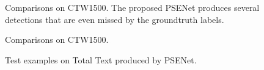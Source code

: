 \documentclass[10pt,twocolumn,letterpaper]{article}
\begin{document}
	
	\begin{figure}[b]
		\centering
		\setlength{\fboxrule}{0pt}
		\caption{Comparisons on CTW1500. The proposed PSENet produces several detections that are even missed by the groundtruth labels.}
		\label{fig:cmp_ctw1}
	\end{figure}
	
	\begin{figure}[b]
		\centering
		\setlength{\fboxrule}{0pt}
		\caption{Comparisons on CTW1500.}
		\label{fig:cmp_ctw2}
	\end{figure}
	
	\begin{figure}[b]
		\centering
		\setlength{\fboxrule}{0pt}
		\caption{Test examples on Total Text produced by PSENet.}
		\label{fig:tt}
	\end{figure}
	
\end{document}
